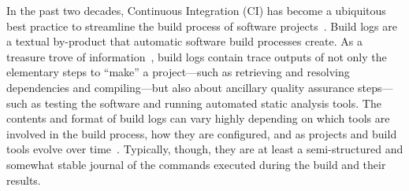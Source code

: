 


\tableofcontents

In the past two decades, Continuous Integration (CI) has become a
ubiquitous best practice to streamline the build process of software
projects~\cite{hilton2016usage,beller2017oops,staahl2014modeling}.
Build logs are a textual by-product that automatic software build
processes create.
As a treasure trove of information~\cite{meyer},
build logs contain trace outputs of not only the elementary steps to
``make'' a project---such as retrieving and resolving dependencies and
compiling---but also about ancillary quality assurance steps---such as
testing the software and running automated static analysis tools.
The
contents and format of build logs can vary highly depending on which tools
are involved in the build process, how they are
configured, and as projects and build tools evolve over
time~\cite{staahl2014modeling}.
Typically, though, they are at least a semi-structured and
somewhat stable journal of the commands executed during the build and
their results.

